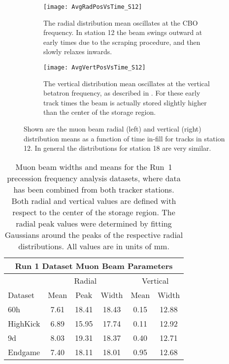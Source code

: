 \begin{figure}
\centering
    \begin{subfigure}[t]{0.47\textwidth}
        \centering
        \texttt{[image: AvgRadPosVsTime\_S12]}
        \caption{The radial distribution mean oscillates at the CBO frequency. In station 12 the beam swings outward at early times due to the scraping procedure, and then slowly relaxes inwards.}
    \end{subfigure}
    \hspace{5mm}
    \begin{subfigure}[t]{0.47\textwidth}
        \centering
        \texttt{[image: AvgVertPosVsTime\_S12]}
        \caption{The vertical distribution mean oscillates at the vertical betatron frequency, as described in . For these early track times the beam is actually stored slightly higher than the center of the storage region.}
    \end{subfigure}
\caption[Muon beam radial and vertical distribution means as a function of time in-fill]{Shown are the muon beam radial (left) and vertical (right) distribution means as a function of time in-fill for tracks in station 12. In general the distributions for station 18 are very similar.}
\label{fig:RadialVerticalMeans}
\end{figure}



\begin{table}
\centering
\renewcommand{\arraystretch}{1.2}
\begin{tabular*}{1\linewidth}{@{\extracolsep{\fill}}lccccc}
  \hline
    \multicolumn{6}{c}{\textbf{Run 1 Dataset Muon Beam Parameters}} \\
  \hline\hline
    & \multicolumn{3}{c}{Radial} & \multicolumn{2}{c}{Vertical} \\
  \hline
    Dataset & Mean & Peak & Width & Mean & Width \\
  \hline
    60h & 7.61 & 18.41 & 18.43 & 0.15 & 12.88 \\
    HighKick & 6.89 & 15.95 & 17.74 & 0.11 & 12.92 \\
    9d & 8.03 & 19.31 & 18.37 & 0.40 & 12.71 \\
    Endgame & 7.40 & 18.11 & 18.01 & 0.95 & 12.68 \\
  \hline
\end{tabular*}
\caption[Run 1 dataset muon beam parameters]{Muon beam widths and means for the Run~1 precession frequency analysis datasets, where data has been combined from both tracker stations. Both radial and vertical values are defined with respect to the center of the storage region. The radial peak values were determined by fitting Gaussians around the peaks of the respective radial distributions. All values are in units of mm.}
\label{tab:MuonBeamParameters}
\end{table}


